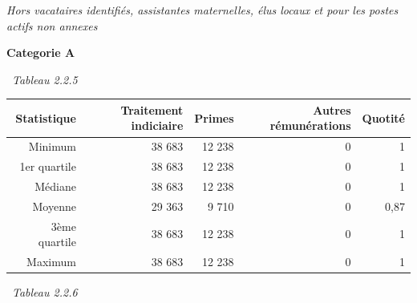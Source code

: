 \emph{Hors vacataires identifiés, assistantes maternelles, élus locaux
et pour les postes actifs non annexes}

\textbf{Categorie A}

~\emph{Tableau 2.2.5}

\begin{longtable}[]{@{}rrrrr@{}}
\toprule
Statistique & Traitement indiciaire & Primes & Autres rémunérations &
Quotité\tabularnewline
\midrule
\endhead
Minimum & 38 683 & 12 238 & 0 & 1\tabularnewline
1er quartile & 38 683 & 12 238 & 0 & 1\tabularnewline
Médiane & 38 683 & 12 238 & 0 & 1\tabularnewline
Moyenne & 29 363 & 9 710 & 0 & 0,87\tabularnewline
3ème quartile & 38 683 & 12 238 & 0 & 1\tabularnewline
Maximum & 38 683 & 12 238 & 0 & 1\tabularnewline
\bottomrule
\end{longtable}

~\emph{Tableau 2.2.6}

